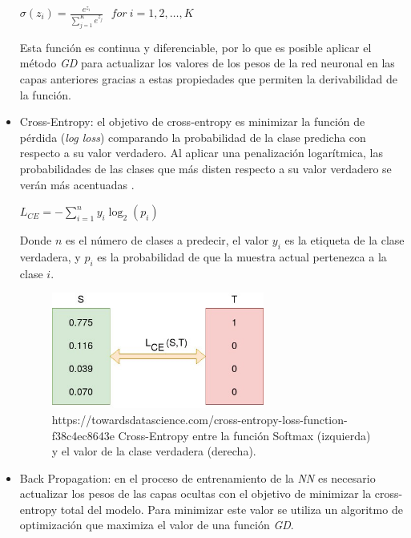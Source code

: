 \begin{itemize}
                    \begin{center}
                        $\sigma(z_i) = \frac{e^{z_{i}}}{\sum_{j=1}^K e^{z_{j}}} \ \ \ for\ i=1,2,\dots,K$
                    \end{center}


                    Esta función es continua y diferenciable, por lo que es posible aplicar el método \textit{GD} para actualizar los valores de los pesos de la red neuronal en las capas anteriores gracias a estas propiedades que permiten la derivabilidad de la función.


                \item Cross-Entropy: el objetivo de cross-entropy es minimizar la función de pérdida (\textit{log loss}) comparando la probabilidad de la clase predicha con respecto a su valor verdadero. Al aplicar una penalización logarítmica, las probabilidades de las clases que más disten respecto a su valor verdadero se verán más acentuadas \cite{Cross-Entropy}.

                    \begin{center}
                        $L_{CE} = -\sum_{i = 1}^n y_i \log_2(p_i)$
                    \end{center}

                    Donde $n$ es el número de clases a predecir, el valor $y_i$ es la etiqueta de la clase verdadera, y $p_i$ es la probabilidad de que la muestra actual pertenezca a la clase $i$.

                    \begin{figure}[h]
                        \centering
                        \includegraphics[width=7cm]{archivos/3.Tecnologias/RedesNeuronales/CrossEntropy}
                        \caption{https://towardsdatascience.com/cross-entropy-loss-function-f38c4ec8643e Cross-Entropy entre la función Softmax (izquierda) y el valor de la clase verdadera (derecha).}
                        \label{CrossEntropyImage}
                     \end{figure}

                \item Back Propagation: en el proceso de entrenamiento de la \textit{NN} es necesario actualizar los pesos de las capas ocultas con el objetivo de minimizar la cross-entropy total del modelo. Para minimizar este valor se utiliza un algoritmo de optimización que maximiza el valor de una función \textit{GD}.


\end{itemize}
